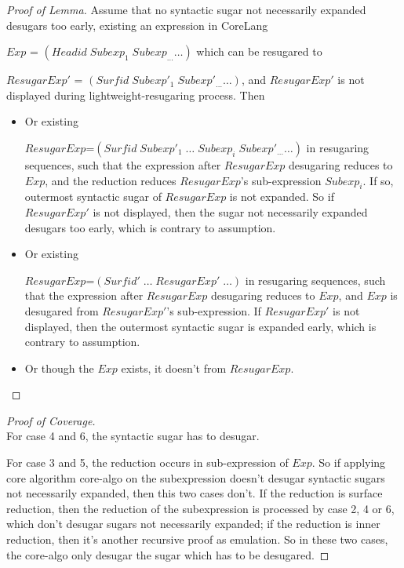 \begin{proof}[Proof of Lemma]
Assume that no syntactic sugar not necessarily expanded desugars too early, existing an expression in CoreLang

$Exp$ = $(Headid\;Subexp_{1}\;Subexp_{\ldots} \ldots)$ which can be resugared to

$ResugarExp'$ = $(Surfid\;Subexp'_{1}\;Subexp'_{\ldots}\ldots)$, and $ResugarExp'$ is not displayed during lightweight-resugaring process. Then

\begin{itemize}
	\item Or existing

	$ResugarExp$=$(Surfid\;Subexp'_{1}\;\ldots\;Subexp_{i}\;Subexp'_{\ldots}\ldots)$ in resugaring sequences, such that the expression after $ResugarExp$ desugaring reduces to $Exp$, and the reduction reduces $ResugarExp$'s sub-expression $Subexp_{i}$. If so, outermost syntactic sugar of $ResugarExp$ is not expanded. So if $ResugarExp'$ is not displayed, then the sugar not necessarily expanded desugars too early, which is contrary to assumption.


	\item Or existing

	$ResugarExp$=$(Surfid'\;\ldots\;ResugarExp'\;\ldots)$ in resugaring sequences, such that the expression after $ResugarExp$ desugaring reduces to $Exp$, and $Exp$ is desugared from $ResugarExp'$'s sub-expression. If $ResugarExp'$ is not displayed, then the outermost syntactic sugar is expanded early, which is contrary to assumption.
	\item Or though the $Exp$ exists, it doesn't from $ResugarExp$.

\end{itemize}
\end{proof}

\begin{proof}[Proof of Coverage]
\hfill\\
For case 4 and 6, the syntactic sugar has to desugar.

For case 3 and 5, the reduction occurs in sub-expression of $Exp$. So if applying core algorithm core-algo on the subexpression doesn't desugar syntactic sugars not necessarily expanded, then this two cases don't. If the reduction is surface reduction, then the reduction of the subexpression is processed by case 2, 4 or 6, which don't desugar sugars not necessarily expanded; if the reduction is inner reduction, then it's another recursive proof as emulation. So in these two cases, the core-algo only desugar the sugar which has to be desugared.
\end{proof}

